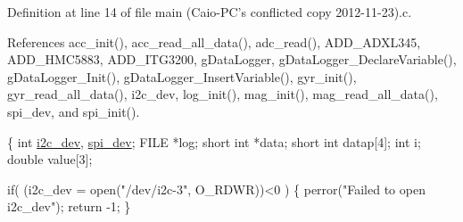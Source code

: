 Definition at line 14 of file main (\-Caio-\/\-P\-C's conflicted copy 2012-\/11-\/23).\-c.



References acc\-\_\-init(), acc\-\_\-read\-\_\-all\-\_\-data(), adc\-\_\-read(), A\-D\-D\-\_\-\-A\-D\-X\-L345, A\-D\-D\-\_\-\-H\-M\-C5883, A\-D\-D\-\_\-\-I\-T\-G3200, g\-Data\-Logger, g\-Data\-Logger\-\_\-\-Declare\-Variable(), g\-Data\-Logger\-\_\-\-Init(), g\-Data\-Logger\-\_\-\-Insert\-Variable(), gyr\-\_\-init(), gyr\-\_\-read\-\_\-all\-\_\-data(), i2c\-\_\-dev, log\-\_\-init(), mag\-\_\-init(), mag\-\_\-read\-\_\-all\-\_\-data(), spi\-\_\-dev, and spi\-\_\-init().


\begin{DoxyCode}
\{
  \textcolor{keywordtype}{int} \hyperlink{CommunicationV0_2communication_8c_a7751bd45ac1064efb35adf1f19c25db8}{i2c\_dev}, \hyperlink{CommunicationV0_2communication_8c_a4788f0a5355494bc6c13690e28f43783}{spi\_dev};
  FILE *log;
  \textcolor{keywordtype}{short} \textcolor{keywordtype}{int} *data;
  \textcolor{keywordtype}{short} \textcolor{keywordtype}{int} datap[4];
  \textcolor{keywordtype}{int} i;
  \textcolor{keywordtype}{double} value[3];

  \textcolor{keywordflow}{if}( (i2c\_dev = open(\textcolor{stringliteral}{"/dev/i2c-3"}, O\_RDWR))<0 )
  \{
    perror(\textcolor{stringliteral}{"Failed to open i2c\_dev"});
    \textcolor{keywordflow}{return} -1;
  \}


\end{DoxyCode}
